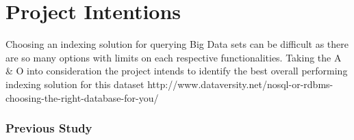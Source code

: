 \section{Project Intentions}
Choosing an indexing solution for querying Big Data sets can be difficult as there are so many options with limits on each respective functionalities. Taking the A \& O into consideration the project intends to identify the best overall performing indexing solution for this dataset 
http://www.dataversity.net/nosql-or-rdbms-choosing-the-right-database-for-you/
\subsubsection{Previous Study}